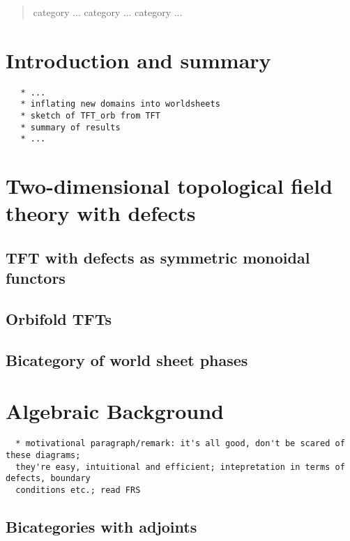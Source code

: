 \documentclass[12pt]{scrartcl}
\theoremstyle{definition}
\numberwithin{equation}{section}
\numberwithin{definition}{section}
\numberwithin{figure}{section}
\begin{document}
\begin{abstract}
category ... category ... category ...
\end{abstract}

\newpage

\tableofcontents



\section{Introduction and summary}\label{introduction}

\begin{verbatim}
   * ...
   * inflating new domains into worldsheets 
   * sketch of TFT_orb from TFT
   * summary of results
   * ...
\end{verbatim}

\section{Two-dimensional topological field theory with defects}

\subsection{TFT with defects as symmetric monoidal functors}

\subsection{Orbifold TFTs}

\subsection{Bicategory of world sheet phases}


\section{Algebraic Background}

\begin{verbatim}
  * motivational paragraph/remark: it's all good, don't be scared of these diagrams; 
  they're easy, intuitional and efficient; intepretation in terms of defects, boundary 
  conditions etc.; read FRS
\end{verbatim}


\subsection{Bicategories with adjoints}
\end{document}
